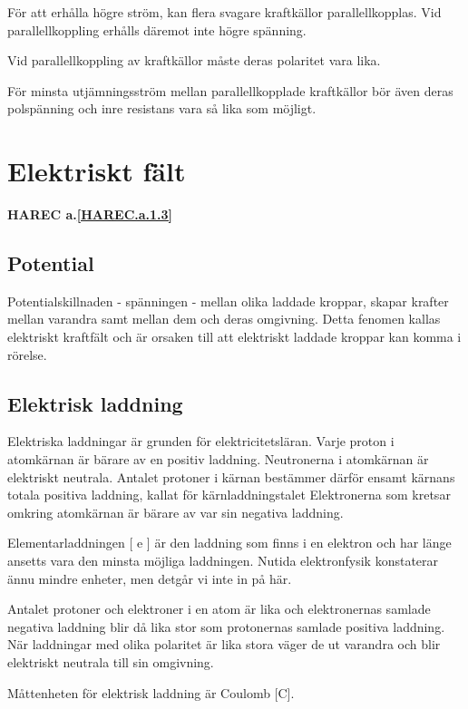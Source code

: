 För att erhålla högre ström, kan flera svagare kraftkällor parallellkopplas. Vid
parallellkoppling erhålls däremot inte högre spänning.

Vid parallellkoppling av kraftkällor måste
deras polaritet vara lika.

För minsta utjämningsström mellan parallellkopplade kraftkällor bör även deras
polspänning och inre resistans vara så lika
som möjligt.

\cleardoublepage

\section{Elektriskt fält}
\textbf{HAREC a.\ref{HAREC.a.1.3}\label{myHAREC.a.1.3}}

\subsection{Potential}

Potentialskillnaden - spänningen - mellan olika laddade kroppar, skapar krafter mellan
varandra samt mellan dem och deras omgivning. Detta fenomen kallas elektriskt kraftfält och är orsaken till att elektriskt laddade kroppar kan komma i rörelse.

\subsection{Elektrisk laddning}

Elektriska laddningar är grunden för elektricitetsläran. Varje proton i atomkärnan är
bärare av en positiv laddning. Neutronerna i atomkärnan är elektriskt neutrala. Antalet
protoner i kärnan bestämmer därför ensamt kärnans totala positiva laddning, kallat för
kärnladdningstalet Elektronerna som kretsar omkring atomkärnan är bärare av var sin
negativa laddning.

Elementarladdningen [ e ] är den laddning som finns i en elektron och har länge
ansetts vara den minsta möjliga laddningen. Nutida elektronfysik konstaterar ännu
mindre enheter, men detgår vi inte in på här.

Antalet protoner och elektroner i en atom är lika och elektronernas samlade negativa
laddning blir då lika stor som protonernas samlade positiva laddning. När laddningar med
olika polaritet är lika stora väger de ut varandra och blir elektriskt neutrala till sin
omgivning.

Måttenheten för elektrisk laddning är Coulomb [C].

